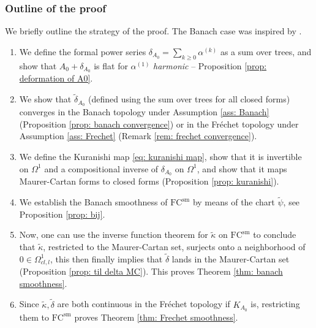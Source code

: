 \documentclass[11pt,a4paper]{amsart}
\theoremstyle{plain} %
\theoremstyle{definition}
\theoremstyle{remark}
\newcommand{\mr}{\mathrm}
\newcommand{\til}{\widetilde}
\newcommand{\FC}{\mathrm{FC}}
\begin{document}
\subsubsection{Outline of the proof}
We briefly outline the strategy of the proof. The Banach case was inspired by \cite{Ho2019}.
\begin{enumerate}
    \item We define the formal power series $\delta_{A_0} = \sum_{k \geq 0} \alpha^{(k)}$ as a sum over trees, and show that $A_0 + \delta_{A_0}$ is flat for $\alpha^{(1)}$ \emph{harmonic} -- Proposition \ref{prop: deformation of A0}. 
    \item We show that $\til\delta_{A_0}$ (defined using the sum over trees for all closed forms) converges in the Banach topology under Assumption \ref{ass: Banach} (Proposition \ref{prop: banach convergence})  or in the Fr\'echet topology under Assumption \ref{ass: Frechet} (Remark \ref{rem: frechet convergence}).
    \item We define the Kuranishi map \eqref{eq: kuranishi map}, show that
    it is invertible on $\Omega^1$ and a compositional inverse of $\delta_{A_0}$ on $\Omega^1$, and show that it maps Maurer-Cartan forms to closed forms (Proposition \ref{prop: kuranishi}).
    \item We establish the Banach smoothness of $\FC^\mr{sm}$ by means of the chart $\til{\psi}$, see Proposition \ref{prop: bij}. 
    \item Now, one can use the inverse function theorem for $\til{\kappa}$ on $\FC^\mr{sm}$ to conclude that $\til{\kappa}$, restricted to the Maurer-Cartan set, surjects onto a neighborhood of $0 \in \Omega^1_{cl,l}$, this then finally implies that $\til{\delta}$ lands in the Maurer-Cartan set (Proposition \ref{prop: til delta MC}). This proves Theorem \ref{thm: banach smoothness}.
    \item Since $\til{\kappa}, \til{\delta}$ are both continuous in the Fr\'echet topology if $K_{A_0}$ is, restricting them to $\FC^\mr{sm}$ proves Theorem \ref{thm: Frechet smoothness}.
\end{enumerate}
\end{document}
